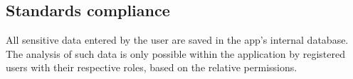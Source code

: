 \subsection{Standards compliance}

All sensitive data entered by the user are saved in the app's internal database. The analysis of such data is only possible within the application by registered users with their respective roles, based on the relative permissions.